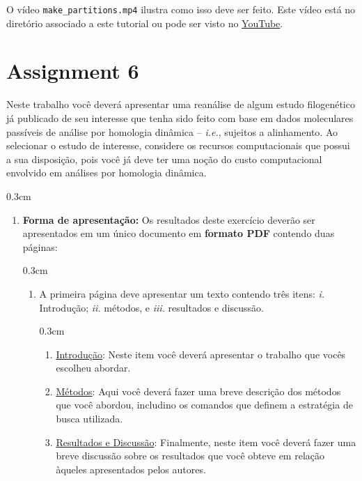 \begin{refsection}
O vídeo \texttt{make_partitions.mp4} ilustra como isso deve ser feito. Este vídeo está no diretório associado a este tutorial ou pode ser visto no  \href{https://youtu.be/ebL7XiXXpRo}{YouTube}.\\


\section{Assignment 6}\label{tut11:assigment}

Neste trabalho você deverá apresentar uma reanálise de algum estudo filogenético já publicado de seu interesse que tenha sido feito com base em dados moleculares passíveis de análise por homologia dinâmica -- \textit{i.e.}, sujeitos a alinhamento. Ao selecionar o estudo de interesse, considere os recursos computacionais que possui a sua disposição, pois você já deve ter uma noção do custo computacional envolvido em análises por homologia dinâmica. 

\begin {myindentpar}{0.3cm}
\begin{enumerate}[\itshape a.]

 \item{\textbf{Forma de apresentação:}} Os resultados deste exercício deverão ser apresentados em um único documento em \textbf{formato PDF} contendo duas páginas:

    \begin {myindentpar}{0.3cm}
    \begin{enumerate}[\itshape 1.]
    \item{A primeira página deve apresentar um texto contendo três itens: \textit{i.} Introdução; \textit{ii.} métodos, e \textit{iii.} resultados e discussão.} 

	\begin {myindentpar}{0.3cm}
	\begin{enumerate}[\itshape i.]
		\item{\underline{Introdução}:} Neste item você deverá apresentar o trabalho que vocês escolheu abordar.\\
		\item{\underline{Métodos}:} Aqui você deverá fazer uma breve descrição dos métodos que você abordou, includino os comandos que definem a estratégia de busca utilizada.\\
		\item{\underline{Resultados e Discussão}:}  Finalmente, neste item você deverá fazer uma breve discussão sobre os resultados que você obteve em relação àqueles apresentados pelos autores.\\
	\end{enumerate}
	\end{myindentpar}


\end{enumerate}
\end{myindentpar}
\end{enumerate}
\end{myindentpar}
\end{refsection}
